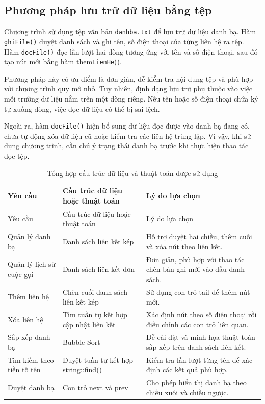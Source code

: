 \documentclass[12pt,a4paper]{report}
\begin{document}
\subsection{Phương pháp lưu trữ dữ liệu bằng tệp}

Chương trình sử dụng tệp văn bản \texttt{danhba.txt} để lưu trữ dữ liệu danh bạ. Hàm \texttt{ghiFile()} duyệt danh sách và ghi tên, số điện thoại của từng liên hệ ra tệp. Hàm \texttt{docFile()} đọc lần lượt hai dòng tương ứng với tên và số điện thoại, sau đó tạo nút mới bằng hàm them\texttt{LienHe}().\par
Phương pháp này có ưu điểm là đơn giản, dễ kiểm tra nội dung tệp và phù hợp với chương trình quy mô nhỏ. Tuy nhiên, định dạng lưu trữ phụ thuộc vào việc mỗi trường dữ liệu nằm trên một dòng riêng. Nếu tên hoặc số điện thoại chứa ký tự xuống dòng, việc đọc dữ liệu có thể bị sai lệch.\par
Ngoài ra, hàm \texttt{docFile()} hiện bổ sung dữ liệu đọc được vào danh bạ đang có, chưa tự động xóa dữ liệu cũ hoặc kiểm tra các liên hệ trùng lặp. Vì vậy, khi sử dụng chương trình, cần chú ý trạng thái danh bạ trước khi thực hiện thao tác đọc tệp.\par
\begin{table}[htbp]\centering\caption{Tổng hợp cấu trúc dữ liệu và thuật toán được sử dụng}\label{tab:cautruc}
\small\begin{tabularx}{\textwidth}{|p{3cm}|p{4cm}|X|}\hline\textbf{Yêu cầu} & \textbf{Cấu trúc dữ liệu hoặc thuật toán} & \textbf{Lý do lựa chọn} \\ \hline
Yêu cầu & Cấu trúc dữ liệu hoặc thuật toán & Lý do lựa chọn \\ \hline
Quản lý danh bạ & Danh sách liên kết kép & Hỗ trợ duyệt hai chiều, thêm cuối và xóa nút theo liên kết. \\ \hline
Quản lý lịch sử cuộc gọi & Danh sách liên kết đơn & Đơn giản, phù hợp với thao tác chèn bản ghi mới vào đầu danh sách. \\ \hline
Thêm liên hệ & Chèn cuối danh sách liên kết kép & Sử dụng con trỏ tail để thêm nút mới. \\ \hline
Xóa liên hệ & Tìm tuần tự kết hợp cập nhật liên kết & Xác định nút theo số điện thoại rồi điều chỉnh các con trỏ liên quan. \\ \hline
Sắp xếp danh bạ & Bubble Sort & Dễ cài đặt và minh họa thuật toán sắp xếp trên danh sách liên kết. \\ \hline
Tìm kiếm theo tiền tố tên & Duyệt tuần tự kết hợp string::find() & Kiểm tra lần lượt từng tên để xác định các kết quả phù hợp. \\ \hline
Duyệt danh bạ & Con trỏ next và prev & Cho phép hiển thị danh bạ theo chiều xuôi và chiều ngược. \\ \hline
\end{tabularx}\end{table}
\end{document}
